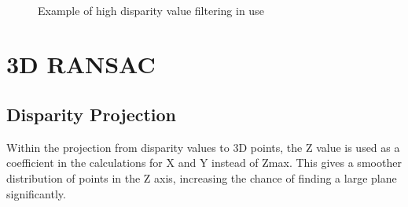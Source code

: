 \documentclass[10pt]{article}
\begin{document}
    \begin{figure}[!h]
        \centering
        \hfill
        \\
        \hfill
        \caption{Example of high disparity value filtering in use}
    \end{figure}

\newpage
\section *{3D RANSAC}
    
\subsection *{Disparity Projection}
    Within the projection from disparity values to 3D points, the Z value is used as a coefficient in the calculations for X and Y instead of Zmax. This gives a smoother distribution of points in the Z axis, increasing the chance of finding a large plane significantly.
\end{document}
